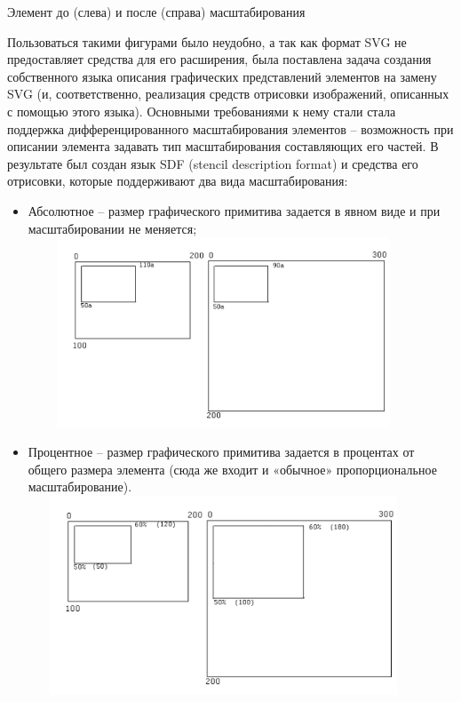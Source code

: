 \documentclass[a4paper]{article}
\newcommand\liststyleWWviiiNumv{%
\renewcommand\theenumi{\arabic{enumi}}
\renewcommand\theenumii{\arabic{enumii}}
\renewcommand\theenumiii{\arabic{enumiii}}
\renewcommand\labelitemi{[F0B7?]}
\renewcommand\labelenumi{\theenumi.}
\renewcommand\labelenumii{\theenumii.}
\renewcommand\labelenumiii{\theenumiii.}
}
\begin{document}
{\centering{}
Элемент до (слева) и после (справа) масштабирования
\par}


\bigskip

{
Пользоваться такими фигурами было неудобно, а так как формат
\foreignlanguage{english}{SVG} не предоставляет средства для его
расширения, была поставлена задача создания собственного языка описания
графических представлений элементов на замену SVG (и, соответственно,
реализация средств отрисовки изображений, описанных с помощью этого
языка). Основными требованиями к нему стали стала поддержка
дифференцированного масштабирования элементов – возможность при
описании элемента задавать тип масштабирования составляющих его частей.
В результате был создан язык SDF (stencil description format) и
средства его отрисовки, которые поддерживают два вида масштабирования:}

\liststyleWWviiiNumv
\begin{itemize}
\item {
Абсолютное – размер графического примитива задается в явном виде и при
масштабировании не меняется;\newline
 \includegraphics[width=11.622cm,height=5.646cm]{draft04-img4.jpg} }
\item {
Процентное – размер графического примитива задается в процентах от
общего размера элемента (сюда же входит и «обычное» пропорциональное
масштабирование).\newline
 \includegraphics[width=11.582cm,height=5.927cm]{draft04-img5.jpg} }
\end{itemize}
\end{document}
